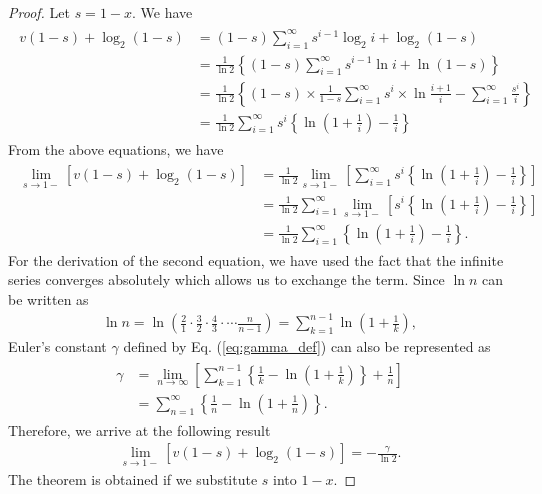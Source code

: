 \begin{proof}
Let $s=1-x$. We have
%
\begin{align}\begin{split}
	v(1-s) + \log_2 (1-s) 
	&= (1-s)\sum_{i=1}^{\infty} s^{i-1}\log_2 i + \log_2 (1-s) \\
	&= \frac{1}{\ln2} \left\{ (1-s) \sum_{i=1}^{\infty}s^{i-1}\ln i + \ln(1-s) \right\} \\
	&= \frac{1}{\ln2} \left\{ (1-s)\times \frac{1}{1-s} \sum_{i=1}^{\infty}s^{i} \times \ln \frac{i+1}{i} - \sum_{i=1}^{\infty} \frac{s^i}{i} \right\} \\
	&= \frac{1}{\ln2} \sum_{i=1}^{\infty}s^{i} \left\{ \ln \left(1+\frac{1}{i}\right) - \frac{1}{i} \right\} 
\end{split}\end{align}
From the above equations, we have
\begin{align}\begin{split}
	\lim_{s\to 1-} \left[ v(1-s) + \log_2 (1-s) \right] 
	&=\frac{1}{\ln2} \lim_{s\to 1-} \left[ \sum_{i=1}^{\infty} s^{i} \left\{ \ln \left(1+\frac{1}{i}\right) - \frac{1}{i} \right\} \right]\\
	&=\frac{1}{\ln2} \sum_{i=1}^{\infty} \lim_{s\to 1-} \left[ s^{i} \left\{ \ln \left(1+\frac{1}{i}\right) - \frac{1}{i} \right\} \right] \\
	&=\frac{1}{\ln2} \sum_{i=1}^{\infty}\left\{ \ln \left(1+\frac{1}{i}\right) - \frac{1}{i} \right\}.
\end{split}\end{align}
For the derivation of the second equation, we have used the fact that the infinite series converges absolutely which allows us to exchange the term. 
%
Since $\ln n$ can be written as 
\begin{align}
	\ln n = \ln \left( \frac{2}{1}\cdot\frac{3}{2}\cdot\frac{4}{3}\cdot\cdots\frac{n}{n-1}\right) = \sum_{k=1}^{n-1}\ln\left(1+\frac{1}{k}\right),
\end{align}
Euler's constant $\gamma$ defined by Eq. (\ref{eq:gamma_def}) can also be represented as
\begin{align}\begin{split}
	\gamma &= \lim_{n\to\infty} \left[ \sum_{k=1}^{n-1}\left\{ \frac{1}{k} - \ln \left(1+\frac{1}{k}\right)\right\} + \frac{1}{n} \right] \\
	&=\sum_{n=1}^{\infty}\left\{ \frac{1}{n} - \ln \left(1+\frac{1}{n}\right) \right\}.
\end{split}\end{align}
Therefore, we arrive at the following result
\begin{align}
	\lim_{s\to 1-} \left[ v(1-s) + \log_2 (1-s) \right]  =- \frac{\gamma}{\ln 2}.
\end{align}
The theorem is obtained if we substitute $s$ into $1-x$.
\end{proof}